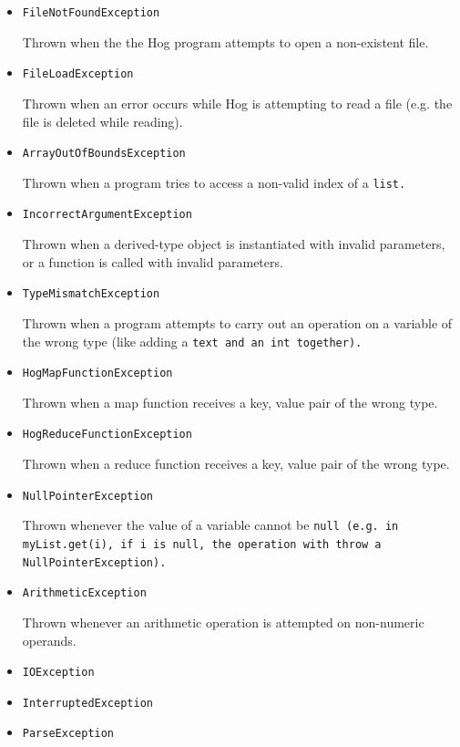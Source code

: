 \documentclass{article}
\begin{document}
\begin{itemize}
  \item[] \tt FileNotFoundException \rm
  
  Thrown when the the Hog program attempts to open a non-existent file.
  
  \item[] \tt FileLoadException \rm
  
  Thrown when an error occurs while Hog is attempting to read a file (e.g. the file is deleted while reading).
  
  \item[] \tt ArrayOutOfBoundsException \rm
  
  Thrown when a program tries to access a non-valid index of a \tt list\rm.
  
  \item[] \tt IncorrectArgumentException \rm
  
  Thrown when a derived-type object is instantiated with invalid parameters, or a function is called with invalid parameters.
  
  \item[] \tt TypeMismatchException \rm
  
  Thrown when a program attempts to carry out an operation on a variable of the wrong type (like adding a \tt text \rm and an
  \tt int \rm together).
  
  \item[] \tt HogMapFunctionException \rm
  
  Thrown when a map function receives a key, value pair of the wrong type.
  
  \item[] \tt HogReduceFunctionException \rm
  
  Thrown when a reduce function receives a key, value pair of the wrong type.
  
  \item[] \tt NullPointerException \rm
  
  Thrown whenever the value of a variable cannot be \tt null \rm (e.g. in \tt myList.get(i)\rm, if \tt i \rm is \tt null\rm,
  the operation with throw a \tt NullPointerException\rm).
  
  \item[] \tt ArithmeticException \rm
  
  Thrown whenever an arithmetic operation is attempted on non-numeric operands.
  
  \item[] \tt IOException \rm
  
  \item[] \tt InterruptedException \rm
  
  \item[] \tt ParseException \rm
\end{itemize}
\end{document}
